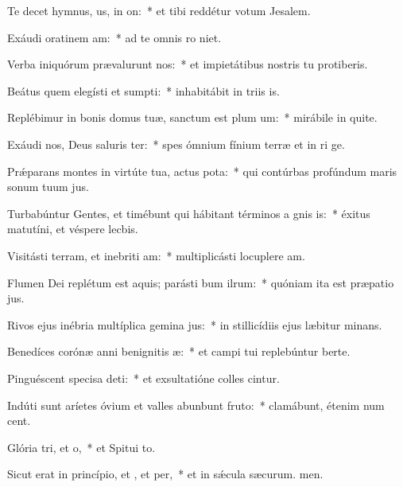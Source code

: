 \item Te decet hymnus, us, in on:~* et tibi reddétur votum  Jesalem.
\item Exáudi oratinem am:~* ad te omnis ro niet.
\item Verba iniquórum prævalurunt  nos:~* et impietátibus nostris tu protiberis.
\item Beátus quem elegísti et sumpti:~* inhabitábit in triis is.
\item Replébimur in bonis domus tuæ, sanctum est plum um:~* mirábile in quite.
\item Exáudi nos, Deus saluris ter:~* spes ómnium fínium terræ et in ri ge.
\item Prǽparans montes in virtúte tua, actus pota:~* qui contúrbas profúndum maris sonum tuum jus.
\item Turbabúntur Gentes, et timébunt qui hábitant términos a gnis is:~* éxitus matutíni, et véspere lecbis.
\item Visitásti terram, et inebriti am:~* multiplicásti locuplere am.
\item Flumen Dei replétum est aquis; parásti bum ilrum:~* quóniam ita est præpatio jus.
\item Rivos ejus inébria multíplica gemina jus:~* in stillicídiis ejus læbitur minans.
\item Benedíces corónæ anni benignitis æ:~* et campi tui replebúntur berte.
\item Pinguéscent specisa deti:~* et exsultatióne colles cintur.
\item Indúti sunt aríetes óvium et valles abunbunt fruto:~* clamábunt, étenim num cent.
\item Glória tri, et o,~* et Spitui to.
\item Sicut erat in princípio, et , et per,~* et in sǽcula sæcurum. men.

